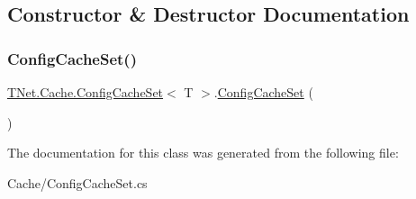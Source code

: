 \subsection{Constructor \& Destructor Documentation}
\mbox{\label{class_t_net_1_1_cache_1_1_config_cache_set_a2514d02ae609415d1204a8acbe8073d3}} 
\subsubsection{\texorpdfstring{Config\+Cache\+Set()}{ConfigCacheSet()}}
{\footnotesize\ttfamily \mbox{\hyperlink{class_t_net_1_1_cache_1_1_config_cache_set}{T\+Net.\+Cache.\+Config\+Cache\+Set}}$<$ T $>$.\mbox{\hyperlink{class_t_net_1_1_cache_1_1_config_cache_set}{Config\+Cache\+Set}} (\begin{DoxyParamCaption}{ }\end{DoxyParamCaption})}







The documentation for this class was generated from the following file\+:\begin{DoxyCompactItemize}
\item 
Cache/Config\+Cache\+Set.\+cs\end{DoxyCompactItemize}
